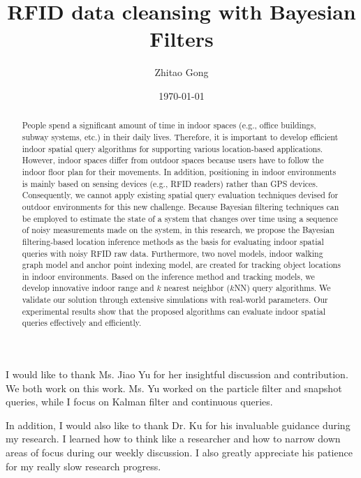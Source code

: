 \documentclass[12pt]{report}
\author{Zhitao Gong}
\date{\today}
\title{RFID data cleansing with Bayesian Filters}
\begin{document}
\maketitle
\TitlePage

\begin{romanpages}


\begin{abstract}
People spend a significant amount of time in indoor spaces (e.g.,
office buildings, subway systems, etc.) in their daily lives.
Therefore, it is important to develop efficient indoor spatial query
algorithms for supporting various location-based applications.
However, indoor spaces differ from outdoor spaces because users have
to follow the indoor floor plan for their movements.  In addition,
positioning in indoor environments is mainly based on sensing devices
(e.g., RFID readers) rather than GPS devices.  Consequently, we cannot
apply existing spatial query evaluation techniques devised for outdoor
environments for this new challenge.  Because Bayesian filtering
techniques can be employed to estimate the state of a system that
changes over time using a sequence of noisy measurements made on the
system, in this research, we propose the Bayesian filtering-based
location inference methods as the basis for evaluating indoor spatial
queries with noisy RFID raw data.  Furthermore, two novel models,
indoor walking graph model and anchor point indexing model, are
created for tracking object locations in indoor environments.  Based
on the inference method and tracking models, we develop innovative
indoor range and \(k\) nearest neighbor (\(k\)NN) query algorithms.
We validate our solution through extensive simulations with real-world
parameters.  Our experimental results show that the proposed
algorithms can evaluate indoor spatial queries effectively and
efficiently.
\end{abstract}

\begin{acknowledgments}
I would like to thank Ms. Jiao Yu for her insightful discussion and
contribution.  We both work on this work.  Ms. Yu worked on the
particle filter and snapshot queries, while I focus on Kalman filter
and continuous queries.

In addition, I would also like to thank Dr. Ku for his invaluable
guidance during my research.  I learned how to think like a researcher
and how to narrow down areas of focus during our weekly discussion.  I
also greatly appreciate his patience for my really slow research
progress.
\end{acknowledgments}

\tableofcontents
\listoffigures
\listoftables
\end{romanpages}
\end{document}
